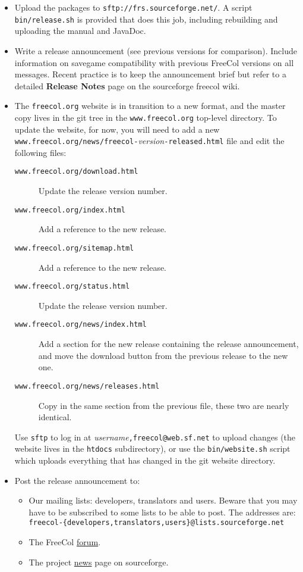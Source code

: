 \documentclass[12pt]{book}
\begin{document}
\begin{itemize}
\item Upload the packages to \verb+sftp://frs.sourceforge.net/+. A
  script \verb|bin/release.sh| is provided that does this job,
  including rebuilding and uploading the manual and JavaDoc. 

\item Write a release announcement (see previous versions for
  comparison). Include information on savegame compatibility with
  previous FreeCol versions on all messages. Recent practice is to
  keep the announcement brief but refer to a detailed \textbf{Release Notes}
  page on the sourceforge freecol wiki.

\item The \texttt{freecol.org} website is in transition to a new
  format, and the master copy lives in the git tree in the
  \texttt{www.freecol.org} top-level directory. To update the
  website, for now, you will need to add a new
  \texttt{www.freecol.org/news/freecol-}\emph{version}\texttt{-released.html}
  file and edit the following files:
  \begin{description}
  \item[\texttt{www.freecol.org/download.html}] Update the release
    version number.
  \item[\texttt{www.freecol.org/index.html}] Add a reference to the
    new release.
  \item[\texttt{www.freecol.org/sitemap.html}] Add a reference to the
    new release.
  \item[\texttt{www.freecol.org/status.html}] Update the release
    version number.
  \item[\texttt{www.freecol.org/news/index.html}] Add a section for
    the new release containing the release announcement, and move the
    download button from the previous release to the new one.
  \item[\texttt{www.freecol.org/news/releases.html}] Copy in the same
    section from the previous file, these two are nearly identical.
  \end{description}
  Use \texttt{sftp} to log in at
  \emph{username}\texttt{,freecol@web.sf.net} to upload changes (the
  website lives in the \texttt{htdocs} subdirectory), or use the
  \verb|bin/website.sh| script which uploads everything that has
  changed in the git website directory.

\item Post the release announcement to:
  \begin{itemize}
    \item Our mailing lists: developers, translators and users.
      Beware that you may have to be subscribed to some lists to be
      able to post. The addresses are:
      \texttt{freecol-\{developers,translators,users\}@lists.sourceforge.net}
    \item The FreeCol
      \href{https://sourceforge.net/p/freecol/discussion/141200/}{forum}.
    \item The project
      \href{https://sourceforge.net/p/freecol/news/}{news} page on sourceforge.
  \end{itemize}


\end{itemize}
\end{document}
